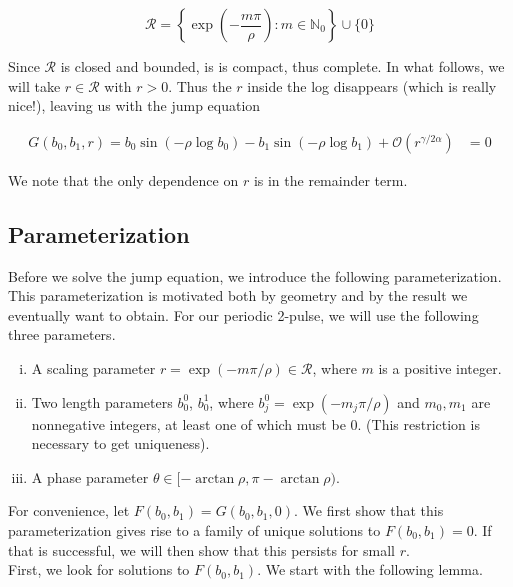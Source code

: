 \documentclass[12pt]{article}
\def\N{{\mathbb N}}
\begin{document}
\begin{equation}\label{setR}
\mathcal{R} = \left\{ \exp\left(-\frac{m \pi}{\rho}\right) : m \in \N_0 \right\} \cup \{ 0 \}
\end{equation}

Since $\mathcal{R}$ is closed and bounded, is is compact, thus complete. In what follows, we will take $r \in \mathcal{R}$ with $r > 0$. Thus the $r$ inside the log disappears (which is really nice!), leaving us with the jump equation

\begin{align}\label{jumpcond3}
G(b_0, b_1,r) =
b_0 \sin(-\rho \log b_0 ) - b_1 \sin(-\rho \log b_1 ) + \mathcal{O}(r^{\gamma / 2 \alpha}) &= 0
\end{align}

We note that the only dependence on $r$ is in the remainder term.

\subsection{Parameterization}

Before we solve the jump equation, we introduce the following parameterization. This parameterization is motivated both by geometry and by the result we eventually want to obtain. For our periodic 2-pulse, we will use the following three parameters.

\begin{enumerate}[(i)]
\item A scaling parameter $r = \exp(-m \pi / \rho ) \in \mathcal{R}$, where $m$ is a positive integer.
\item Two length parameters $b_0^0$, $b_0^1$, where $b_j^0 = \exp(-m_j \pi / \rho )$ and $m_0, m_1$ are nonnegative integers, at least one of which must be 0. (This restriction is necessary to get uniqueness).
\item A phase parameter $\theta \in [-\arctan \rho, \pi - \arctan \rho)$.
\end{enumerate}

For convenience, let $F(b_0, b_1) = G(b_0, b_1, 0)$. We first show that this parameterization gives rise to a family of unique solutions to $F(b_0, b_1) = 0$. If that is successful, we will then show that this persists for small $r$.\\

First, we look for solutions to $F(b_0, b_1)$. We start with the following lemma.
\end{document}
